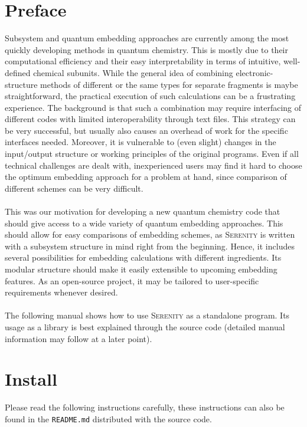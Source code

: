\documentclass[bibliography=totocnumbered,a4paper,10pt,oneside]{scrbook}
\newcommand{
\serenity}{\textsc{Serenity}\xspace}
\begin{document}
\chapter{Preface}
Subsystem and quantum embedding approaches are currently among the most quickly developing
methods in quantum chemistry. This is mostly due to their computational efficiency
and their easy interpretability in terms of intuitive, well-defined chemical subunits.
While the general idea of combining electronic-structure methods of different or the same
types for separate fragments is maybe straightforward, the practical execution of such
calculations can be a frustrating experience. The background is that such a combination
may require interfacing of different codes with limited interoperability through text files.
This strategy can be very successful, but usually also causes an overhead of work for the specific
interfaces needed. Moreover, it is vulnerable to (even slight) changes in the input/output
structure or working principles of the original programs. Even if all technical challenges
are dealt with, inexperienced users may find it hard to choose the optimum embedding approach
for a problem at hand, since comparison of different schemes can be very difficult.\\
\\
This was our motivation for developing a new quantum chemistry code that should give access
to a wide variety of quantum embedding approaches. This should allow for easy comparisons
of embedding schemes, as \serenity is written with a subsystem structure in mind right from
the beginning. Hence, it includes several possibilities for embedding calculations with
different ingredients. Its modular structure should make it easily extensible to upcoming
embedding features. As an open-source project, it may be tailored to user-specific requirements
whenever desired.\\
\\
The following manual shows how to use \serenity as a standalone program. Its usage as a
library is best explained through the source code (detailed manual
information may follow at a later point).


\chapter{Install}
Please read the following instructions carefully, these instructions can also be found in the \texttt{README.md} distributed with
the source code.
\end{document}
